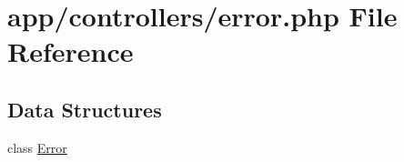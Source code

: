 \hypertarget{controllers_2error_8php}{}\section{app/controllers/error.php File Reference}
\label{controllers_2error_8php}
\subsection*{Data Structures}
\begin{DoxyCompactItemize}
\item 
class \hyperlink{classError}{Error}
\end{DoxyCompactItemize}
